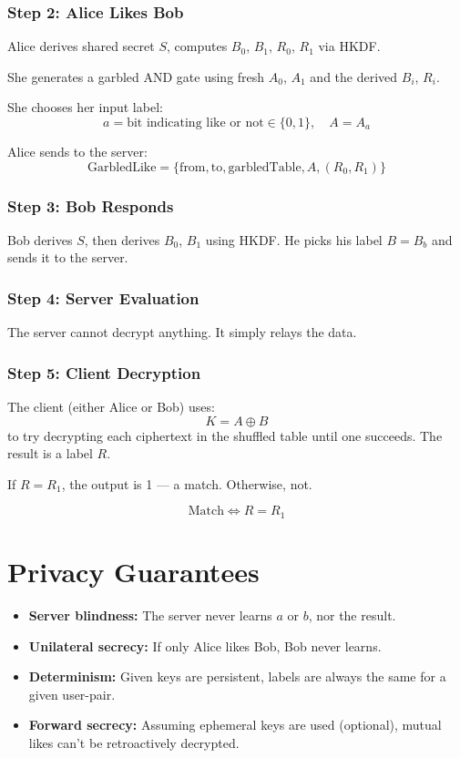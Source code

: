 \documentclass[12pt]{article}
\begin{document}
\subsubsection*{Step 2: Alice Likes Bob}

Alice derives shared secret $S$, computes $B_0$, $B_1$, $R_0$, $R_1$ via HKDF.

She generates a garbled AND gate using fresh $A_0$, $A_1$ and the derived $B_i$, $R_i$.

She chooses her input label:
\[
a = \text{bit indicating like or not} \in \{0,1\},\quad A = A_a
\]

Alice sends to the server:
\[
\text{GarbledLike} = \{ \text{from}, \text{to}, \text{garbledTable}, A, (R_0, R_1) \}
\]

\subsubsection*{Step 3: Bob Responds}

Bob derives $S$, then derives $B_0$, $B_1$ using HKDF. He picks his label $B = B_b$ and sends it to the server.

\subsubsection*{Step 4: Server Evaluation}

The server cannot decrypt anything. It simply relays the data.

\subsubsection*{Step 5: Client Decryption}

The client (either Alice or Bob) uses:
\[
K = A \oplus B
\]
to try decrypting each ciphertext in the shuffled table until one succeeds. The result is a label $R$.

If $R = R_1$, the output is 1 — a match. Otherwise, not.

\[
\text{Match} \iff R = R_1
\]

\section*{Privacy Guarantees}

\begin{itemize}
  \item \textbf{Server blindness:} The server never learns $a$ or $b$, nor the result.
  \item \textbf{Unilateral secrecy:} If only Alice likes Bob, Bob never learns.
  \item \textbf{Determinism:} Given keys are persistent, labels are always the same for a given user-pair.
  \item \textbf{Forward secrecy:} Assuming ephemeral keys are used (optional), mutual likes can't be retroactively decrypted.
\end{itemize}
\end{document}
